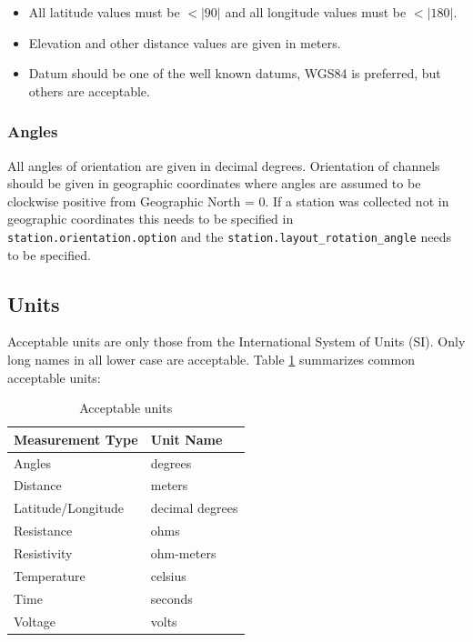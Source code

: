 \documentclass[12pt]{article}
\begin{document}
\begin{itemize}
	\setlength\itemsep{0em}
	\item All latitude values must be $<|90|$ and all longitude values must be $<|180|$.
	\item Elevation and other distance values are given in meters.
	\item Datum should be one of the well known datums, WGS84 is preferred, but others are acceptable.
\end{itemize} 

\subsubsection{Angles}

All angles of orientation are given in decimal degrees.  Orientation of channels should be given in geographic coordinates where angles are assumed to be clockwise positive from Geographic North = 0.  If a station was collected not in geographic coordinates this needs to be specified in \verb|station.orientation.option| and the \verb|station.layout_rotation_angle| needs to be specified.   

\subsection{Units}
Acceptable units are only those from the International System of Units (SI).  Only long names in all lower case are acceptable.  Table \ref{tab:units} summarizes common acceptable units:


\begin{table}[!h]
	\centering
	\caption[Acceptable units]{Acceptable units}
	\begin{tabular}{ll}
		\toprule
		\textbf{Measurement Type} & \textbf{Unit Name} \\ \midrule
		Angles & degrees \\ \midrule
		
		Distance &  meters  \\ \midrule
		Latitude/Longitude & decimal degrees \\ \midrule
		Resistance & ohms   \\ \midrule
		Resistivity & ohm-meters \\ \midrule
		Temperature & celsius\\ \midrule
		Time & seconds\\ \midrule
		Voltage & volts \\ \bottomrule
		
		
	\end{tabular}
	\label{tab:units}
\end{table}
\end{document}
